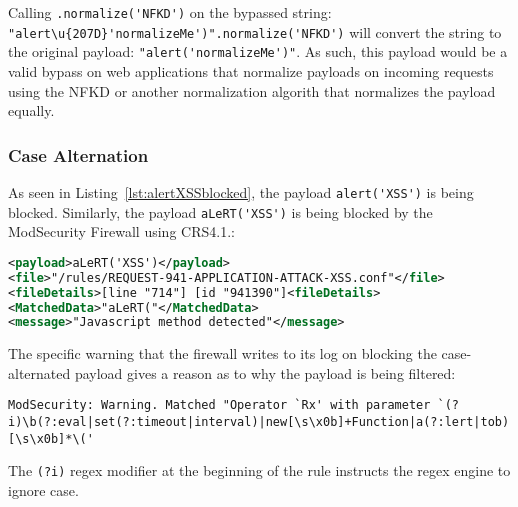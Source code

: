 Calling \verb|.normalize('NFKD')| on the bypassed string:\\ 
\verb|"alert\u{207D}'normalizeMe')".normalize('NFKD')| will convert the string to the original payload: \verb|"alert('normalizeMe')"|. As such, this payload would be a valid bypass on web applications that normalize payloads on incoming requests using the NFKD or another normalization algorith that normalizes the payload equally. 


\subsubsection{Case Alternation}
\label{sec:casealternationevaluation}
As seen in Listing~\ref{lst:alertXSSblocked}, the payload \verb|alert('XSS')| is being blocked. Similarly, the payload \verb|aLeRT('XSS')| is being blocked by the ModSecurity Firewall using CRS4.1.:

\begin{lstlisting}[style=ruleStyle, language=XML, caption=alert("normalizeMe") blocked, label=lst:alertcasealternationblocked]
<payload>aLeRT('XSS')</payload>
<file>"/rules/REQUEST-941-APPLICATION-ATTACK-XSS.conf"</file>
<fileDetails>[line "714"] [id "941390"]<fileDetails>
<MatchedData>"aLeRT("</MatchedData>
<message>"Javascript method detected"</message>
\end{lstlisting}

The specific warning that the firewall writes to its log on blocking the case-alternated payload gives a reason as to why the payload is being filtered:
\begin{lstlisting}[style=basicStyle, caption=ModSecurity warning on case alternated payloads, label={lst:modsecwarning}]
	ModSecurity: Warning. Matched "Operator `Rx' with parameter `(?i)\b(?:eval|set(?:timeout|interval)|new[\s\x0b]+Function|a(?:lert|tob)|btoa|prompt|confirm)[\s\x0b]*\('
\end{lstlisting}
The \verb|(?i)| regex modifier at the beginning of the rule instructs the regex engine to ignore case.



